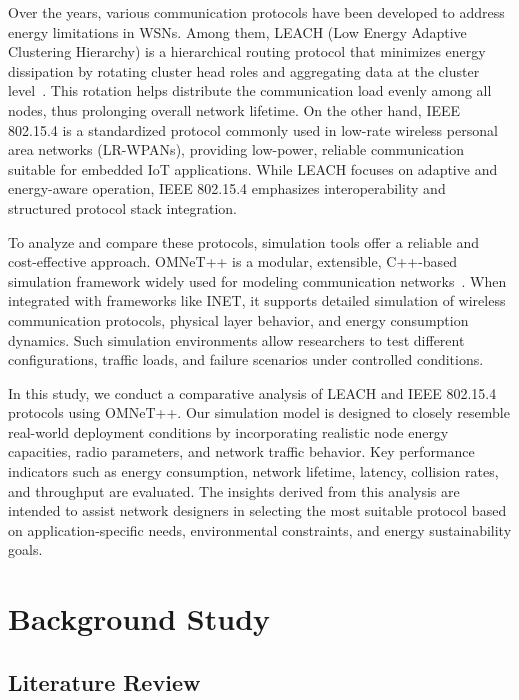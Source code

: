 \documentclass[conference]{IEEEtran}
\begin{document}
Over the years, various communication protocols have been developed to address energy limitations in WSNs. Among them, LEACH (Low Energy Adaptive Clustering Hierarchy) is a hierarchical routing protocol that minimizes energy dissipation by rotating cluster head roles and aggregating data at the cluster level~\cite{leach_orig}. This rotation helps distribute the communication load evenly among all nodes, thus prolonging overall network lifetime. On the other hand, IEEE 802.15.4 is a standardized protocol commonly used in low-rate wireless personal area networks (LR-WPANs), providing low-power, reliable communication suitable for embedded IoT applications. While LEACH focuses on adaptive and energy-aware operation, IEEE 802.15.4 emphasizes interoperability and structured protocol stack integration.

To analyze and compare these protocols, simulation tools offer a reliable and cost-effective approach. OMNeT++ is a modular, extensible, C++-based simulation framework widely used for modeling communication networks~\cite{omnet_ref}. When integrated with frameworks like INET, it supports detailed simulation of wireless communication protocols, physical layer behavior, and energy consumption dynamics. Such simulation environments allow researchers to test different configurations, traffic loads, and failure scenarios under controlled conditions.

In this study, we conduct a comparative analysis of LEACH and IEEE 802.15.4 protocols using OMNeT++. Our simulation model is designed to closely resemble real-world deployment conditions by incorporating realistic node energy capacities, radio parameters, and network traffic behavior. Key performance indicators such as energy consumption, network lifetime, latency, collision rates, and throughput are evaluated. The insights derived from this analysis are intended to assist network designers in selecting the most suitable protocol based on application-specific needs, environmental constraints, and energy sustainability goals.



\section{Background Study}

\subsection{Literature Review}
\end{document}
